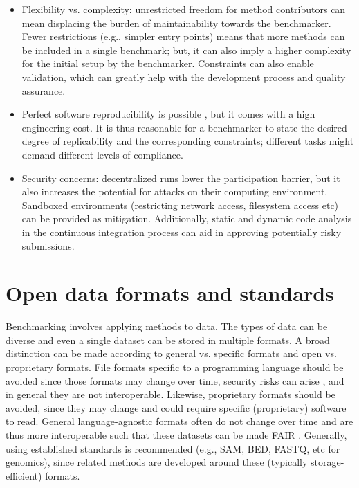 \documentclass[11pt]{article}
\begin{document}
\begin{itemize}
    \item Flexibility vs. complexity: unrestricted freedom for method contributors can mean displacing the burden of maintainability towards the benchmarker. Fewer restrictions (e.g., simpler entry points) means that more methods can be included in a single benchmark; but, it can also imply a higher complexity for the initial setup by the benchmarker. Constraints can also enable validation, which can greatly help with the development process and quality assurance.
    \item  Perfect software reproducibility is possible \cite{Lamb2021-tb}, but it comes with a high engineering cost. It is thus reasonable for a benchmarker to state the desired degree of replicability and the corresponding constraints; different tasks might demand different levels of compliance. 
    \item  Security concerns: decentralized runs lower the participation barrier, but it also increases the potential for attacks on their computing environment. Sandboxed environments (restricting network access, filesystem access etc) can be provided as mitigation. Additionally, static and dynamic code analysis in the continuous integration process can aid in approving potentially risky submissions.
\end{itemize}


\section*{Open data formats and standards}

Benchmarking involves applying methods to data. The types of data can be diverse and even a single dataset can be stored in multiple formats. A broad distinction can be made according to general vs. specific formats and open vs. proprietary formats. File formats specific to a programming language should be avoided since those formats may change over time, security risks can arise \cite{Huynh2023-pq, Bleih2024-lv}, and in general they are not interoperable. Likewise, proprietary formats should be avoided, since they may change and could require specific (proprietary) software to read. General language-agnostic formats often do not change over time and are thus more interoperable such that these datasets can be made FAIR \cite{Wilkinson2016-bh}. Generally, using established standards is recommended (e.g., SAM, BED, FASTQ, etc for genomics), since related methods are developed around these (typically storage-efficient) formats.
\end{document}
